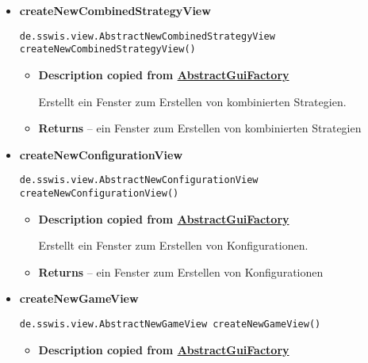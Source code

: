 {{{{{{{{{{\begin{itemize}
{\begin{itemize}
{Erstellt eine Ergebnisansicht mit allen Simulationen einer Multikonfiguration.
}
\item{{\bf  Returns} -- 
eine Ergebnisansicht mit allen Simulationen einer Multikonfiguration 
}%
\end{itemize}
}%
\item{ 
\hypertarget{de.sswis.controller.SwingGuiFactory.createNewCombinedStrategyView()}{{\bf  createNewCombinedStrategyView}\\}
\begin{lstlisting}[frame=none]
de.sswis.view.AbstractNewCombinedStrategyView createNewCombinedStrategyView()\end{lstlisting} %
\begin{itemize}
\item{
{\bf  Description copied from \hyperlink{de.sswis.controller.AbstractGuiFactory}{AbstractGuiFactory}{\small {}} }

Erstellt ein Fenster zum Erstellen von kombinierten Strategien.
}
\item{{\bf  Returns} -- 
ein Fenster zum Erstellen von kombinierten Strategien 
}%
\end{itemize}
}%
\item{ 
\hypertarget{de.sswis.controller.SwingGuiFactory.createNewConfigurationView()}{{\bf  createNewConfigurationView}\\}
\begin{lstlisting}[frame=none]
de.sswis.view.AbstractNewConfigurationView createNewConfigurationView()\end{lstlisting} %
\begin{itemize}
\item{
{\bf  Description copied from \hyperlink{de.sswis.controller.AbstractGuiFactory}{AbstractGuiFactory}{\small {}} }

Erstellt ein Fenster zum Erstellen von Konfigurationen.
}
\item{{\bf  Returns} -- 
ein Fenster zum Erstellen von Konfigurationen 
}%
\end{itemize}
}%
\item{ 
\hypertarget{de.sswis.controller.SwingGuiFactory.createNewGameView()}{{\bf  createNewGameView}\\}
\begin{lstlisting}[frame=none]
de.sswis.view.AbstractNewGameView createNewGameView()\end{lstlisting} %
\begin{itemize}
\item{
{\bf  Description copied from \hyperlink{de.sswis.controller.AbstractGuiFactory}{AbstractGuiFactory}{\small {}} }

}
\end{itemize}}
\end{itemize}}}}}}}}}}}
